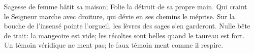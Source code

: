 Sagesse de femme bâtit sa maison;
	Folie la détruit de sa propre main.
Qui craint le Seigneur marche avec droiture,
	qui dévie en ses chemins le méprise.
Sur la bouche de l’insensé pointe l’orgueil,
	les lèvres des sages s’en garderont.
Nulle bête de trait: la mangeoire est vide;
	les récoltes sont belles quand le taureau est fort.
Un témoin véridique ne ment pas;
	le faux témoin ment comme il respire.
